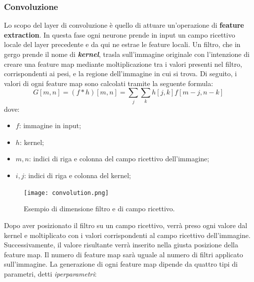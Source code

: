 \subsubsection{Convoluzione}
Lo scopo del layer di convoluzione è quello di 
attuare un'operazione di {\bfseries{feature extraction}}. In questa fase ogni neurone prende in input un campo 
ricettivo locale del layer precedente e da qui ne estrae le feature locali. Un 
filtro, che in gergo prende il nome di {\bfseries{\emph{kernel}}}, trasla sull'immagine originale 
con l'intenzione di creare una feature map mediante moltiplicazione tra i 
valori presenti nel filtro, corrispondenti ai pesi, e la regione dell'immagine in 
cui si trova. Di seguito, i valori di ogni feature map sono calcolati tramite 
la seguente formula:
\begin{equation}\label{sum convolution}
    G[m,n] = (f*h)[m,n] = \sum_j\sum_kh[j,k]f[m-j,n-k]
\end{equation}
dove:
\begin{itemize}
    \item $f$: immagine in input;
    \item $h$: kernel;
    \item $m,n$: indici di riga e colonna del campo ricettivo dell'immagine;
    \item $i,j$: indici di riga e colonna del kernel;
\end{itemize}
\begin{figure}
    \centering
    \texttt{[image: convolution.png]}
    \centering
    \caption{Esempio di dimensione filtro e di campo ricettivo.}
    \label{filter dimension}
\end{figure}
Dopo aver posizionato il filtro su un campo ricettivo, verrà preso ogni 
valore dal kernel e moltiplicato con i valori corrispondenti al campo ricettivo 
dell'immagine. Successivamente, il valore risultante verrà inserito nella 
giusta posizione della feature map. Il numero di feature map sarà uguale 
al numero di filtri applicato sull'immagine. La generazione di ogni feature 
map dipende da quattro tipi di parametri, detti \emph{iperparametri}:
